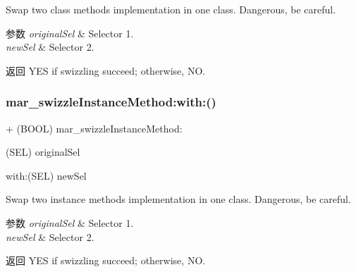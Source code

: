 Swap two class method\textquotesingle{}s implementation in one class. Dangerous, be careful.


\begin{DoxyParams}{参数}
{\em original\+Sel} & Selector 1. \\
\hline
{\em new\+Sel} & Selector 2. \\
\hline
\end{DoxyParams}
\begin{DoxyReturn}{返回}
Y\+ES if swizzling succeed; otherwise, NO. 
\end{DoxyReturn}
\mbox{\label{category_n_s_object_07_m_a_r_e_x___r_u_n_t_i_m_e_08_a6471910e9a4a9044dc6f18de15e7d090}} 
\subsubsection{\texorpdfstring{mar\+\_\+swizzle\+Instance\+Method\+:with\+:()}{mar\_swizzleInstanceMethod:with:()}}
{\footnotesize\ttfamily + (B\+O\+OL) mar\+\_\+swizzle\+Instance\+Method\+: \begin{DoxyParamCaption}\item[{(S\+EL)}]{original\+Sel }\item[{with:(S\+EL)}]{new\+Sel }\end{DoxyParamCaption}}

Swap two instance method\textquotesingle{}s implementation in one class. Dangerous, be careful.


\begin{DoxyParams}{参数}
{\em original\+Sel} & Selector 1. \\
\hline
{\em new\+Sel} & Selector 2. \\
\hline
\end{DoxyParams}
\begin{DoxyReturn}{返回}
Y\+ES if swizzling succeed; otherwise, NO. 
\end{DoxyReturn}
\mbox{\label{category_n_s_object_07_m_a_r_e_x___r_u_n_t_i_m_e_08_ab70e7eca2f70666c311c863f6e0359b8}} 
